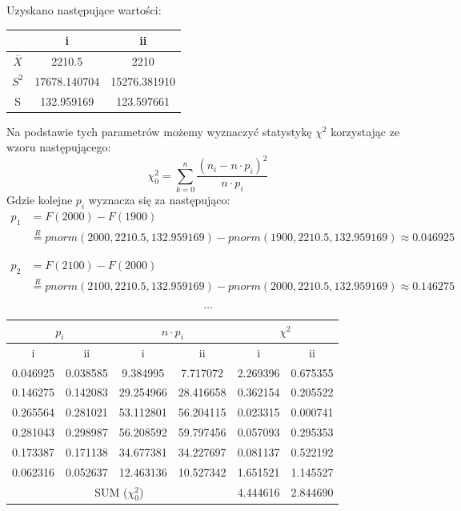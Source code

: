 \documentclass{article}
\begin{document}
Uzyskano następujące wartości:
\begin{center} \begin{tabular}{|c|c|c|} \hline
 & i & ii \\ \hline
$\overline{X}$ & 2210.5 & 2210 \\ \hline
$S^2$ & 17678.140704 & 15276.381910 \\ \hline
S & 132.959169 & 123.597661 \\ \hline
\end{tabular} \end{center}

Na podstawie tych parametrów możemy wyznaczyć statystykę $\chi^2$ korzystając ze wzoru następującego:
\[ \chi^2_0 = \sum_{k=0}^n \frac{(n_i - n \cdot p_i)^2}{n \cdot p_i} \]
Gdzie kolejne $p_i$ wyznacza się za następująco:
\begin{align*}
p_1 & = F(2000) - F(1900) \\
& \overset{R}{=} pnorm(2000, 2210.5, 132.959169) - pnorm(1900, 2210.5, 132.959169) \approx 0.046925 \end{align*}

\begin{align*} p_2 & = F(2100) - F(2000) \\
& \overset{R}{=} pnorm(2100, 2210.5, 132.959169) - pnorm(2000, 2210.5, 132.959169) \approx 0.146275 \end{align*}

\[ \dots \]

\begin{center} \begin{tabular}{|c|c|c|c|c|c|} \hline
\multicolumn{2}{|c|}{$p_i$} & \multicolumn{2}{|c|}{$n \cdot p_i$} & \multicolumn{2}{|c|}{$\chi^2$} \\ \hline
i & ii & i & ii & i & ii \\ \hline
0.046925 & 0.038585 & 9.384995 & 7.717072 & 2.269396 & 0.675355 \\ \hline
0.146275 & 0.142083 & 29.254966 & 28.416658 & 0.362154 & 0.205522 \\ \hline
0.265564 & 0.281021 & 53.112801 & 56.204115 & 0.023315 & 0.000741 \\ \hline
0.281043 & 0.298987 & 56.208592 & 59.797456 & 0.057093 & 0.295353 \\ \hline
0.173387 & 0.171138 & 34.677381 & 34.227697 & 0.081137 & 0.522192 \\ \hline
0.062316 & 0.052637 & 12.463136 & 10.527342 & 1.651521 & 1.145527 \\ \hline
\multicolumn{4}{|c|}{SUM ($\chi^2_0$)} & 4.444616 & 2.844690 \\ \hline
\end{tabular} \end{center}
\end{document}
